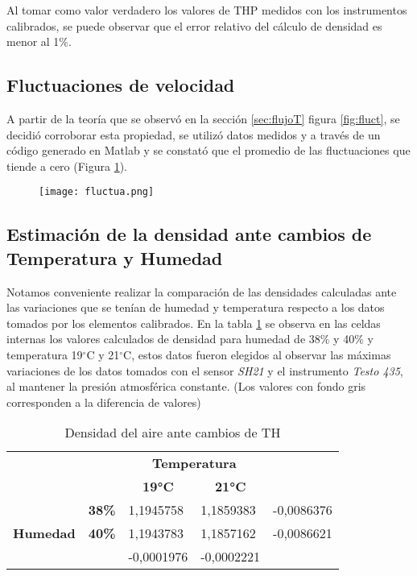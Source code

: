 Al tomar como valor verdadero los valores de THP medidos con los instrumentos calibrados, se puede observar que el error relativo del cálculo de densidad es menor al 1\%.

\subsection{Fluctuaciones de velocidad}
A partir de la teoría que se observó en la sección \ref{sec:flujoT} figura \ref{fig:fluct}, se decidió corroborar esta propiedad, se utilizó datos medidos y a través de un código generado en Matlab y se constató que el promedio de las fluctuaciones que tiende a cero (Figura \ref{fig:fluct2}).
\begin{figure}[H]
	\centering
	\texttt{[image: fluctua.png]}
	\label{fig:fluct2}
\end{figure}


\subsection{Estimación de la densidad ante cambios de Temperatura y Humedad}
Notamos conveniente realizar la comparación de las densidades calculadas ante las variaciones que se tenían de humedad y temperatura respecto a los datos tomados por los elementos calibrados. En la tabla \ref{densTH} se observa en las celdas internas los valores calculados de densidad para humedad de 38$\%$ y 40$\%$ y temperatura 19$^{\circ}$C y 21$^{\circ}$C, estos datos fueron elegidos al observar las máximas variaciones de los datos tomados con el sensor \textit{SH21} y el instrumento \textit{Testo 435}, al mantener la presión atmosférica constante.
(Los valores con fondo gris corresponden a la diferencia de valores)

\begin{table}[h!]
	\centering
	\begin{tabular}{lllll}
		&  & \multicolumn{2}{c}{\textbf{Temperatura}} &  \\
		&  & \multicolumn{1}{c}{\textbf{19°C}} & \multicolumn{1}{c}{\textbf{21°C}} & \multicolumn{1}{c}{\textbf{}} \\
		\multicolumn{1}{c}{} & \multicolumn{1}{r}{\textbf{38\%}} & 1,1945758 & 1,1859383 & \cellcolor[HTML]{F2F2F2}-0,0086376 \\
		\multicolumn{1}{c}{\multirow{-2}{*}{\textbf{Humedad}}} & \multicolumn{1}{r}{\textbf{40\%}} & 1,1943783 & 1,1857162 & \cellcolor[HTML]{F2F2F2}-0,0086621 \\
		& \multicolumn{1}{c}{\textbf{}} & \cellcolor[HTML]{F2F2F2}-0,0001976 & \cellcolor[HTML]{F2F2F2}-0,0002221 & 
	\end{tabular}
\caption{Densidad del aire ante cambios de TH}
\label{densTH}
\end{table}

